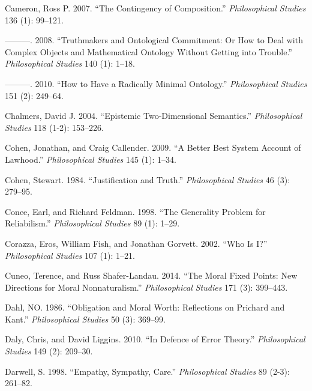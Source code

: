 \documentclass[
  10pt,
  letterpaper,
  DIV=11,
  numbers=noendperiod,
  twoside]{scrartcl}
\newlength{\cslhangindent}
\newenvironment{CSLReferences}[2] %
 {\begin{list}{}{%
  \setlength{\itemindent}{0pt}
  \setlength{\leftmargin}{0pt}
  \setlength{\parsep}{0pt}
  \ifodd #1
   \setlength{\leftmargin}{\cslhangindent}
   \setlength{\itemindent}{-1\cslhangindent}
  \fi
  \setlength{\itemsep}{#2\baselineskip}}}
 {\end{list}}
\begin{document}
\begin{CSLReferences}{1}{0}
Cameron, Ross P. 2007. {``The Contingency of Composition.''}
\emph{Philosophical Studies} 136 (1): 99--121.

---------. 2008. {``Truthmakers and Ontological Commitment: Or How to
Deal with Complex Objects and Mathematical Ontology Without Getting into
Trouble.''} \emph{Philosophical Studies} 140 (1): 1--18.

---------. 2010. {``How to Have a Radically Minimal Ontology.''}
\emph{Philosophical Studies} 151 (2): 249--64.

Chalmers, David J. 2004. {``Epistemic Two-Dimensional Semantics.''}
\emph{Philosophical Studies} 118 (1-2): 153--226.

Cohen, Jonathan, and Craig Callender. 2009. {``A Better Best System
Account of Lawhood.''} \emph{Philosophical Studies} 145 (1): 1--34.

Cohen, Stewart. 1984. {``Justification and Truth.''} \emph{Philosophical
Studies} 46 (3): 279--95.

Conee, Earl, and Richard Feldman. 1998. {``The Generality Problem for
Reliabilism.''} \emph{Philosophical Studies} 89 (1): 1--29.

Corazza, Eros, William Fish, and Jonathan Gorvett. 2002. {``Who Is
{I}?''} \emph{Philosophical Studies} 107 (1): 1--21.

Cuneo, Terence, and Russ Shafer-Landau. 2014. {``The Moral Fixed Points:
New Directions for Moral Nonnaturalism.''} \emph{Philosophical Studies}
171 (3): 399--443.

Dahl, NO. 1986. {``Obligation and Moral Worth: Reflections on Prichard
and Kant.''} \emph{Philosophical Studies} 50 (3): 369--99.

Daly, Chris, and David Liggins. 2010. {``In Defence of Error Theory.''}
\emph{Philosophical Studies} 149 (2): 209--30.

Darwell, S. 1998. {``Empathy, Sympathy, Care.''} \emph{Philosophical
Studies} 89 (2-3): 261--82.


\end{CSLReferences}
\end{document}
